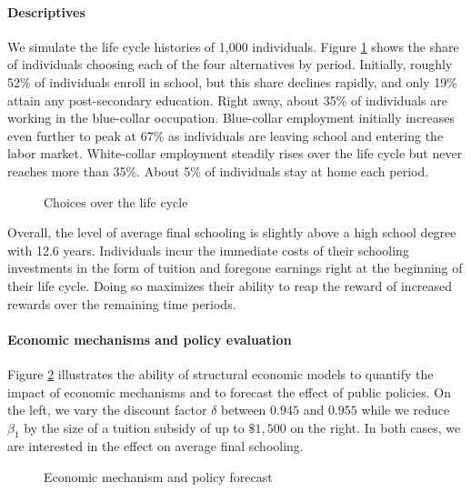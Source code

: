 \paragraph{Descriptives} We simulate the life cycle histories of 1,000 individuals. Figure \ref{Choices over the life cycle} shows the share of individuals choosing each of the four alternatives by period. Initially, roughly 52\% of individuals enroll in school, but this share declines rapidly, and only 19\% attain any post-secondary education. Right away, about 35\% of individuals are working in the blue-collar occupation.  Blue-collar employment initially increases even further to peak at 67\% as individuals are leaving school and entering the labor market. White-collar employment steadily rises over the life cycle but never reaches more than 35\%. About 5\% of individuals stay at home each period.

\begin{figure}[ht!]\centering
\caption{Choices over the life cycle}\label{Choices over the life cycle}
\end{figure}\FloatBarrier

\noindent Overall, the level of average final schooling is slightly above a high school degree with 12.6 years. Individuals incur the immediate costs of their schooling investments in the form of tuition and foregone earnings right at the beginning of their life cycle. Doing so maximizes their ability to reap the reward of increased rewards over the remaining time periods.

\paragraph{Economic mechanisms and policy evaluation} Figure \ref{Economic mechanism and policy forecast} illustrates the ability of structural economic models to quantify the impact of economic mechanisms and to forecast the effect of public policies. On the left, we vary the discount factor $\delta$ between $0.945$ and $0.955$ while we reduce $\beta_1$ by the size of a tuition subsidy of up to $\$1,500$ on the right. In both cases, we are interested in the effect on average final schooling.

\begin{figure}[h!]\centering
\caption{Economic mechanism and policy forecast}\label{Economic mechanism and policy forecast}
\hspace{0.3cm}
\end{figure}\FloatBarrier

